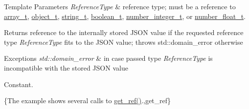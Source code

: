 \begin{DoxyTemplParams}{Template Parameters}
{\em Reference\-Type} & reference type; must be a reference to \hyperlink{classnlohmann_1_1basic__json_ab00b882d39306d663c23dab110f5cae0}{array\-\_\-t}, \hyperlink{classnlohmann_1_1basic__json_a0ac9894c9de8dc551cf2e5f1c605537f}{object\-\_\-t}, \hyperlink{classnlohmann_1_1basic__json_ab63e618bbb0371042b1bec17f5891f42}{string\-\_\-t}, \hyperlink{classnlohmann_1_1basic__json_af3bc3e83aa162d7ba4df16a949872723}{boolean\-\_\-t}, \hyperlink{classnlohmann_1_1basic__json_ac4b10b2364f26ce47bdb9a413ff04a59}{number\-\_\-integer\-\_\-t}, or \hyperlink{classnlohmann_1_1basic__json_a74a0013e847fdc574b48f931f0e757e1}{number\-\_\-float\-\_\-t}.\\
\hline
\end{DoxyTemplParams}
\begin{DoxyReturn}{Returns}
reference to the internally stored J\-S\-O\-N value if the requested reference type {\itshape Reference\-Type} fits to the J\-S\-O\-N value; throws std\-::domain\-\_\-error otherwise
\end{DoxyReturn}

\begin{DoxyExceptions}{Exceptions}
{\em std\-::domain\-\_\-error} & in case passed type {\itshape Reference\-Type} is incompatible with the stored J\-S\-O\-N value\\
\hline
\end{DoxyExceptions}
Constant.

\{The example shows several calls to {\ttfamily \hyperlink{classnlohmann_1_1basic__json_a4f332e90f3cae562d0c3fa6ba48f74f9}{get\-\_\-ref()}}.,get\-\_\-ref\}

